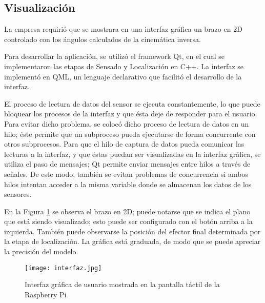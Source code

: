 \subsection{Visualización}

La empresa requirió que se mostrara en una interfaz gráfica un brazo en 2D controlado con los ángulos calculados de la cinemática inversa.

Para desarrollar la aplicación, se utilizó el framework Qt, en el cual se implementaron las etapas de Sensado y Localización en C++. La interfaz se implementó en QML, un lenguaje declarativo que facilitó el desarrollo de la interfaz.

El proceso de lectura de datos del sensor se ejecuta constantemente, lo que puede bloquear los procesos de la interfaz y que ésta deje de responder para el usuario. Para evitar dicho problema, se colocó dicho proceso de lectura de datos en un hilo; éste permite que un subproceso pueda ejecutarse de forma concurrente con otros subprocesos. Para que el hilo de captura de datos pueda comunicar las lecturas a la interfaz, y que éstas puedan ser visualizadas en la interfaz gráfica, se utiliza el paso de mensajes; Qt permite enviar mensajes entre hilos a través de señales. De este modo, también se evitan problemas de concurrencia si ambos hilos intentan acceder a la misma variable donde se almacenan los datos de los sensores.

En la Figura \ref{fig:interfaz} se observa el brazo en 2D; puede notarse que se indica el plano que está siendo visualizado; esto puede ser configurado con el botón arriba a la izquierda. También puede observarse la posición del efector final determinada por la etapa de localización. La gráfica está graduada, de modo que se puede apreciar la precisión del modelo.

\begin{figure}[htb]
	\centering
	\texttt{[image: interfaz.jpg]}
	\caption{Interfaz gráfica de usuario mostrada en la pantalla táctil de la Raspberry Pi}
	\label{fig:interfaz}
\end{figure}